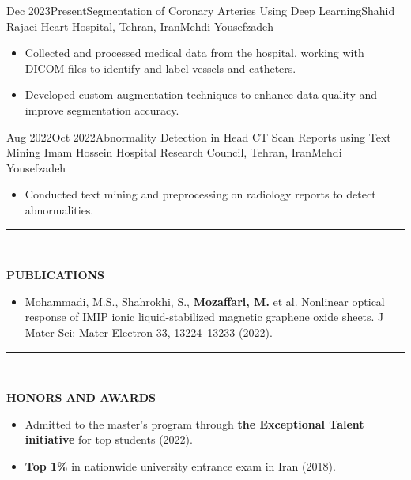 \documentclass[11pt, b4paper]{cv}
\begin{document}
\begin{research_exp}{Dec 2023}{Present}{Segmentation of Coronary Arteries Using Deep Learning}{Shahid Rajaei Heart Hospital, Tehran, Iran}{Mehdi Yousefzadeh}
	\begin{itemize}
        \item Collected and processed medical data from the hospital, working with DICOM files to identify and label vessels and catheters.
        \item Developed custom augmentation techniques to enhance data quality and improve segmentation accuracy.	\end{itemize}
	
\end{research_exp}
\vspace{-0.1in}

\begin{research_exp}{Aug 2022}{Oct 2022}{Abnormality Detection in Head CT Scan Reports using Text Mining
	}{Imam Hossein Hospital Research Council, Tehran, Iran}{Mehdi Yousefzadeh}
	
	\begin{itemize}
		\item Conducted text mining and preprocessing on radiology reports to detect abnormalities.
	\end{itemize}
\end{research_exp}
    

\vspace{-0.15in}
\rule{\textwidth}{1pt}\\
\vspace{-0.15in}

\textbf{PUBLICATIONS}
\vspace{-0.10in}

\begin{itemize}
	\item 	Mohammadi, M.S., Shahrokhi, S., \textbf{Mozaffari, M.} et al. Nonlinear optical response of IMIP ionic
	liquid-stabilized magnetic graphene oxide sheets. J Mater Sci: Mater Electron 33, 13224–13233
	(2022).
\end{itemize}


\vspace{-0.15in}
\rule{\textwidth}{1pt}\\
\vspace{-0.15in}

\textbf{HONORS AND AWARDS}
\vspace{-0.10in}

\begin{itemize}
	\item Admitted to the master’s program through \textbf{the Exceptional Talent initiative} for top students (2022).
    \item \textbf{Top 1\%} in nationwide university entrance exam in Iran (2018).
\end{itemize}
\end{document}
